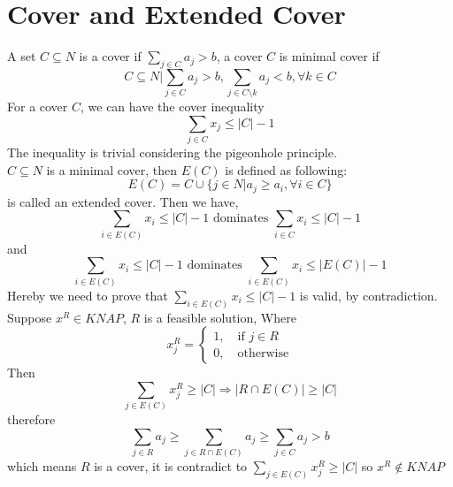 			\section{Cover and Extended Cover}
				A set $C\subseteq N$ is a cover if $\sum_{j\in C} a_j > b$, a cover $C$ is minimal cover if
				\begin{equation}
					C\subseteq N | \sum_{j\in C}a_j>b, \sum_{j\in C\setminus k} a_j < b, \forall k \in C 
				\end{equation}
				For a cover $C$, we can have the cover inequality
				\begin{equation}
					\sum_{j\in C}x_j \le |C|-1
				\end{equation}
				The inequality is trivial considering the pigeonhole principle.\\
				$C\subseteq N$ is a minimal cover, then $E(C)$ is defined as following:
				\begin{equation}
					E(C) = C\cup \{j \in N | a_j \ge a_i, \forall i \in C\}
				\end{equation}
				is called an extended cover. Then we have,
				\begin{equation}
					\sum_{i\in E(C)} x_i \le |C| - 1 \text{ dominates } \sum_{i\in C} x_i \le |C| - 1
				\end{equation}
				and
				\begin{equation}
					\sum_{i\in E(C)} x_i \le |C| - 1 \text{ dominates } \sum_{i\in E(C)} x_i \le |E(C)| - 1
				\end{equation}
				Hereby we need to prove that $\sum_{i\in E(C)} x_i \le |C| - 1$ is valid, by contradiction.\\
				 Suppose $x^R \in KNAP$, $R$ is a feasible solution, Where
				\begin{equation}
					x^R_j = \begin{cases}1, \quad \text{if $j\in R$} \\ 0, \quad \text{otherwise}\end{cases} 
				\end{equation}
				Then
				\begin{equation}
					\sum_{j\in E(C)}x^R_j \ge |C| \Rightarrow |R \cap E(C)| \ge |C|  
				\end{equation}
				therefore
				\begin{equation}
					\sum_{j\in R}a_j \ge \sum_{j\in R \cap E(C)} a_j \ge \sum_{j\in C} a_j > b 
				\end{equation}
				which means $R$ is a cover, it is contradict to $\sum_{j\in E(C)}x^R_j \ge |C|$ so $x^R \notin KNAP$

